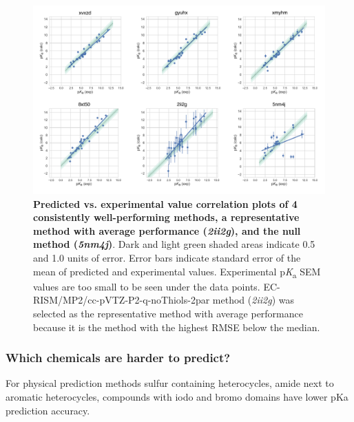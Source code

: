 \documentclass[9pt,lineno,final]{elife}
\newcommand{\pKa}{p\textit{K}\textsubscript{a}}
\begin{document}


\begin{figure}
\centering
\includegraphics[width=1.0\linewidth]{figures/typeIII-pred-vs-exp-correlation-fig.pdf}
\caption{{\bf Predicted vs. experimental value correlation plots of 4 consistently well-performing methods, a representative method with average performance (\textit{2ii2g}), and the null method (\textit{5nm4j})}. 
Dark and light green shaded areas indicate 0.5 and 1.0 units of error. Error bars indicate standard error of the mean of predicted and experimental values. Experimental \pKa{} SEM values are too small to be seen under the data points. EC-RISM/MP2/cc-pVTZ-P2-q-noThiols-2par method (\textit{2ii2g}) was selected as the representative method with average performance because it is the method with the highest RMSE below the median.
}
\label{fig:typeIII_pred_vs_exp_correlation}
\end{figure}



\subsubsection{Which chemicals are harder to predict?}

For physical prediction methods sulfur containing heterocycles, amide next to aromatic heterocycles, compounds with iodo and bromo domains have lower pKa prediction accuracy.
\end{document}
